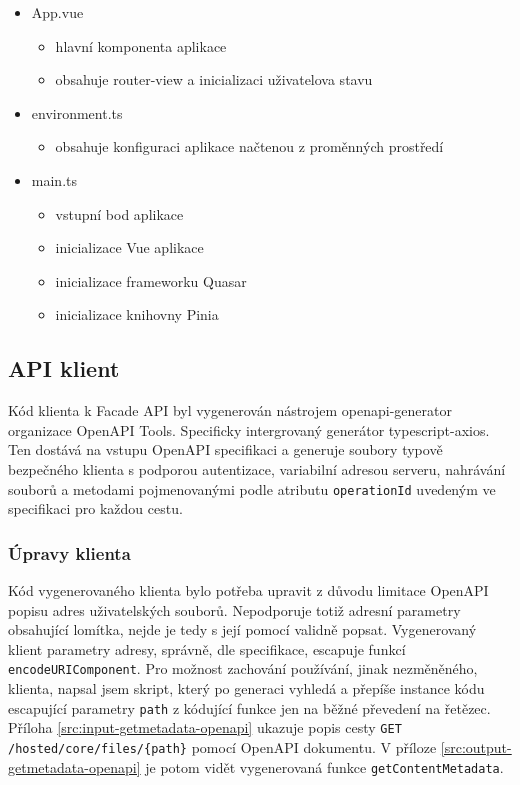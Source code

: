 \begin{itemize}
\begin{itemize}
        \end{itemize}
    \item App.vue
        \begin{itemize}
            \item hlavní komponenta aplikace
            \item obsahuje router-view a inicializaci uživatelova stavu
        \end{itemize}
    \item environment.ts
        \begin{itemize}
            \item obsahuje konfiguraci aplikace načtenou z proměnných prostředí
        \end{itemize}
    \item main.ts
        \begin{itemize}
            \item vstupní bod aplikace
            \item inicializace Vue aplikace
            \item inicializace frameworku Quasar
            \item inicializace knihovny Pinia\cite{VuejsPinia2024}
        \end{itemize}
\end{itemize}

\subsection{API klient}
Kód klienta k Facade API byl vygenerován nástrojem openapi-generator organizace OpenAPI Tools. Specificky intergrovaný generátor typescript-axios. Ten dostává na vstupu OpenAPI specifikaci a generuje soubory typově bezpečného klienta s podporou autentizace, variabilní adresou serveru, nahrávání souborů a metodami pojmenovanými podle atributu \lstinline|operationId| uvedeným ve specifikaci pro každou cestu.

\subsubsection{Úpravy klienta}
Kód vygenerovaného klienta bylo potřeba upravit z důvodu limitace OpenAPI popisu adres uživatelských souborů. Nepodporuje totiž adresní parametry obsahující lomítka, nejde je tedy s její pomocí validně popsat. Vygenerovaný klient parametry adresy, správně, dle specifikace, escapuje funkcí \lstinline|encodeURIComponent|. Pro možnost zachování používání, jinak nezměněného, klienta, napsal jsem skript, který po generaci vyhledá a přepíše instance kódu escapující parametry \lstinline|path| z kódující funkce jen na běžné převedení na řetězec. Příloha \ref{src:input-getmetadata-openapi} ukazuje popis cesty \lstinline|GET /hosted/core/files/{path}| pomocí OpenAPI dokumentu. V příloze \ref{src:output-getmetadata-openapi} je potom vidět vygenerovaná funkce \lstinline|getContentMetadata|.

